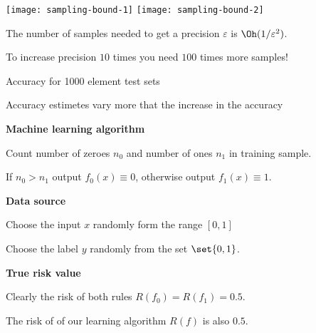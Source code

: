 \documentclass[landscape,footrule]{foils}
\begin{document}

\begin{center}
\texttt{[image: sampling-bound-1]}\hspace*{1cm}
\texttt{[image: sampling-bound-2]}
\end{center}
\vspace*{-0.5cm}

The number of samples needed to get a precision $\varepsilon$ is $\Oh(1/\varepsilon^2)$. 
\begin{triangles}
\item To increase precision $10$ times you need $100$ times more samples!
\end{triangles}

\enlargethispage{1cm}
\vspace{-3ex}
\begin{triangles}
\item Accuracy for 1000 element test sets
\item Accuracy estimetes vary more that the increase in the accuracy
\end{triangles}





\textbf{Machine learning algorithm}
\begin{triangles}
\item Count number of zeroes $n_0$ and number of ones $n_1$ in training sample.
\item If $n_0>n_1$ output $f_0(x)\equiv 0$, otherwise output $f_1(x)\equiv 1$.
\end{triangles}
\vspace*{1cm}

\textbf{Data source}
\begin{triangles}
\item Choose the input $x$ randomly form the range $[0,1]$
\item Choose the label $y$ randomly from the set $\set{0,1}$.
\end{triangles}

\vspace*{1cm}
\textbf{True risk value}
\begin{triangles}
\item Clearly the risk of both rules $R(f_0)=R(f_1)=0.5$.
\item The risk of of our learning algorithm $R(f)$ is also $0.5$. 
\end{triangles}
\end{document}

